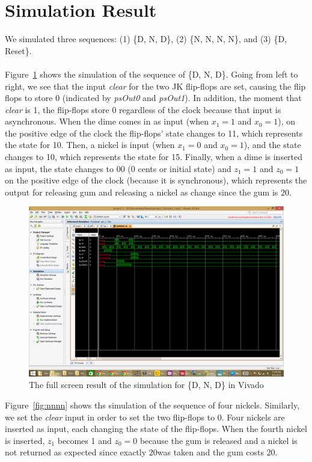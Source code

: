 \documentclass{article}
\begin{document}
\section{Simulation Result}
We simulated three sequences: (1) \{D, N, D\}, (2) \{N, N, N, N\}, and (3) 
\{D, Reset\}.\\
\\
Figure~\ref{fig:dnd} shows the simulation of the sequence of \{D, N, D\}. Going 
from left to right, we see that the input \textit{clear} for the two JK 
flip-flops are set, causing the flip flops to store 0 (indicated by 
\textit{psOut0} and \textit{psOut1}). In addition, the moment that 
\textit{clear} is 1, the flip-flops store 0 regardless of the clock because 
that input is asynchronous. When the dime comes in as input (when $x_1=1$ and 
$x_0=1$), on the positive edge of the clock the flip-flops' state changes to 
11, which represents the state for 10\textcent. Then, a nickel is input (when 
$x_1=0$ and $x_0=1$), and the state changes to 10, which represents the state 
for 15\textcent. Finally, when a dime is inserted as input, the state changes to 
00 (0 cents or initial state) and $z_1=1$ and $z_0=1$ on the positive edge of 
the clock (because it is synchronous), which represents the output for 
releasing gum and releasing a nickel as change since the gum is 20\textcent.

\begin{figure}[h!]
\centering
\includegraphics[scale=0.4]{DND}
\caption{The full screen result of the simulation for \{D, N, D\} in Vivado}
\label{fig:dnd}
\end{figure}

Figure~\ref{fig:nnnn} shows ths simulation of the sequence of four nickels. 
Similarly, we set the \textit{clear} input in order to set the two flip-flops 
to 0. Four nickels are inserted as input, each changing the state of the 
flip-flops.  When the fourth nickel is inserted, $z_1$ becomes 1 and $z_0=0$ 
because the gum is released and a nickel is not returned as expected since 
exactly 20\textcent was taken and the gum costs 20\textcent. 
\end{document}
